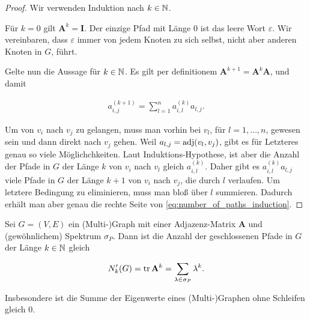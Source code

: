             \begin{proof}

                Wir verwenden Induktion nach $k \in \mathbb N$.

                Für $k = 0$ gilt $\mathbf A^k = \mathbf I$.
                Der einzige Pfad mit Länge $0$ ist das leere Wort $\varepsilon$.
                Wir vereinbaren, dass $\varepsilon$ immer von jedem Knoten zu sich selbst, nicht aber anderen Knoten in $G$, führt.

                Gelte nun die Aussage für $k \in \mathbb N$.
                Es gilt per definitionem $\mathbf A^{k+1} = \mathbf A^k \mathbf A$, und damit

                \begin{align} \label{eq:number_of_paths_induction}
                    a_{i,j}^{(k+1)}
                    =
                    \sum_{l=1}^n
                        a_{i,l}^{(k)}
                        a_{l,j}.
                \end{align}

                Um von $v_i$ nach $v_j$ zu gelangen, muss man vorhin bei $v_l$, für $l = 1, \dots, n$, gewesen sein und dann direkt nach $v_j$ gehen.
                Weil $a_{l, j} = \operatorname{adj}(v_l, v_j)$, gibt es für Letzteres genau so viele Möglichchkeiten.
                Laut Induktions-Hypothese, ist aber die Anzahl der Pfade in $G$ der Länge $k$ von $v_i$ nach $v_l$ gleich $a_{i,l}^{(k)}$.
                Daher gibt es $a_{i,l}^{(k)} a_{l,j}$ viele Pfade in $G$ der Länge $k+1$ von $v_i$ nach $v_j$, die durch $l$ verlaufen.
                Um letztere Bedingung zu eliminieren, muss man bloß über $l$ summieren.
                Dadurch erhält man aber genau die rechte Seite von \ref{eq:number_of_paths_induction}.

            \end{proof}

            \begin{corollary} \label{cor:number_of_paths_closed}

                Sei $G = (V, E)$ ein (Multi-)Graph mit einer Adjazenz-Matrix $\mathbf A$ und (gewöhnlichem) Spektrum $\sigma_P$.
                Dann ist die Anzahl der geschlossenen Pfade in $G$ der Länge $k \in \mathbb N$ gleich

                \begin{align*}
                    N_k^\prime(G)
                    =
                    \operatorname{tr} \mathbf A^k
                    =
                    \sum_{\lambda \in \sigma_P} \lambda^k.
                \end{align*}

                Insbesondere ist die Summe der Eigenwerte eines (Multi-)Graphen ohne Schleifen gleich $0$.

            \end{corollary}

